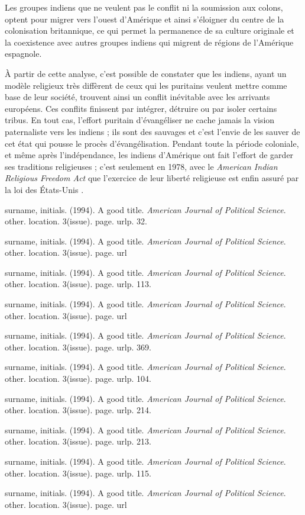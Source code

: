 \documentclass{article}
\begin{document}
Les groupes indiens que ne veulent pas le conflit ni la soumission aux colons, optent pour migrer vers l'ouest d'Amérique et ainsi s'éloigner du centre de la colonisation britannique, ce qui permet la permanence de sa culture originale et la coexistence avec autres groupes indiens qui migrent de régions de l'Amérique espagnole.

À partir de cette analyse, c'est possible de constater que les indiens, ayant un modèle religieux très diffèrent de ceux qui les puritains veulent mettre comme base de leur société, trouvent ainsi un conflit inévitable avec les arrivants européens. Ces conflits finissent par intégrer, détruire ou par isoler certains tribus. En tout cas, l'effort puritain d'évangéliser ne cache jamais la vision paternaliste vers les indiens ; ils sont des sauvages et c'est l'envie de les sauver de cet état qui pousse le procès d'évangélisation. Pendant toute la période coloniale, et même après l'indépendance, les indiens d'Amérique ont fait l'effort de garder ses traditions religieuses ; c'est seulement en 1978, avec le \emph{American Indian Religious Freedom Act} que l'exercice de leur liberté religieuse est enfin assuré par la loi des États-Unis \cite{code-10}.

\newpage

\begin{thebibliography}{1}
\raggedright
{}
surname, initials. (1994). A good title. \emph{American Journal of Political Science}. other. location. 3(issue). page. urlp. 32. 

surname, initials. (1994). A good title. \emph{American Journal of Political Science}. other. location. 3(issue). page. url

surname, initials. (1994). A good title. \emph{American Journal of Political Science}. other. location. 3(issue). page. urlp. 113. 

surname, initials. (1994). A good title. \emph{American Journal of Political Science}. other. location. 3(issue). page. url

surname, initials. (1994). A good title. \emph{American Journal of Political Science}. other. location. 3(issue). page. urlp. 369. 

surname, initials. (1994). A good title. \emph{American Journal of Political Science}. other. location. 3(issue). page. urlp. 104. 

surname, initials. (1994). A good title. \emph{American Journal of Political Science}. other. location. 3(issue). page. urlp. 214. 

surname, initials. (1994). A good title. \emph{American Journal of Political Science}. other. location. 3(issue). page. urlp. 213. 

surname, initials. (1994). A good title. \emph{American Journal of Political Science}. other. location. 3(issue). page. urlp. 115. 

surname, initials. (1994). A good title. \emph{American Journal of Political Science}. other. location. 3(issue). page. url

\end{thebibliography}
\end{document}
